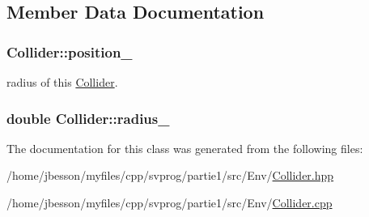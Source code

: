 \subsection{Member Data Documentation}
\hypertarget{class_collider_a6e88f831b1ca9fb7a99637be1ac1570f}{
\subsubsection[{position\-\_\-}]{ Collider\-::position\-\_\-\hspace{0.3cm}{\ttfamily [private]}}}\label{class_collider_a6e88f831b1ca9fb7a99637be1ac1570f}
radius of this \hyperlink{class_collider}{Collider}. \hypertarget{class_collider_a762d208b956ffa20644243c8eb8ebefa}{
\subsubsection[{radius\-\_\-}]{\setlength{\rightskip}{0pt plus 5cm}double Collider\-::radius\-\_\-\hspace{0.3cm}{\ttfamily [private]}}}\label{class_collider_a762d208b956ffa20644243c8eb8ebefa}


The documentation for this class was generated from the following files\-:\begin{DoxyCompactItemize}
\item 
/home/jbesson/myfiles/cpp/svprog/partie1/src/\-Env/\hyperlink{_collider_8hpp}{Collider.\-hpp}\item 
/home/jbesson/myfiles/cpp/svprog/partie1/src/\-Env/\hyperlink{_collider_8cpp}{Collider.\-cpp}\end{DoxyCompactItemize}
